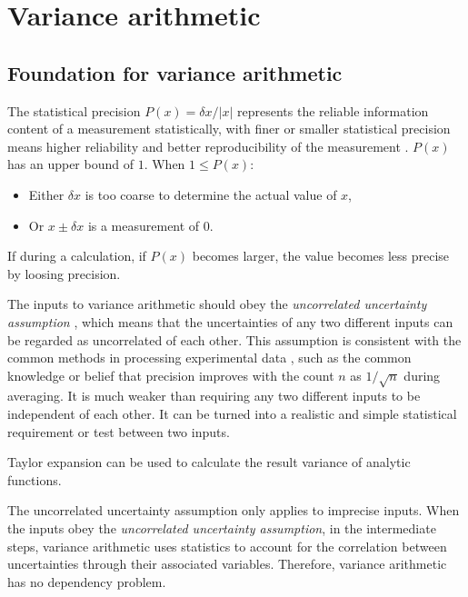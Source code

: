 \documentclass[twoside]{article}
\numberwithin{equation}{section}
\begin{document}
\clearpage
\section{Variance arithmetic}
\label{sec: variance arithmetic}


\subsection{Foundation for variance arithmetic}

The statistical precision $P(x) = \delta x/|x|$ represents the reliable information content of a measurement statistically, with finer or smaller statistical precision means higher reliability and better reproducibility of the measurement \cite{Statistical_Methods}\cite{Precisions_Physical_Measurements}. 
$P(x)$ has an upper bound of $1$.
When $1 \leq P(x)$:
\begin{itemize}
\item Either $\delta x$ is too coarse to determine the actual value of $x$, 

\item Or $x \pm \delta x$ is a measurement of $0$.
\end{itemize}
If during a calculation, if $P(x)$ becomes larger, the value becomes less precise by loosing precision.

The inputs to variance arithmetic should obey the \emph{uncorrelated uncertainty assumption} \cite{Prev_Precision_Arithmetic}, which means that the uncertainties of any two different inputs can be regarded as uncorrelated of each other. 
This assumption is consistent with the common methods in processing experimental data \cite{Statistical_Methods}\cite{Precisions_Physical_Measurements}, such as the common knowledge or belief that precision improves with the count $n$ as $1 / \sqrt{n}$ during averaging.
It is much weaker than requiring any two different inputs to be independent of each other.
It can be turned into a realistic and simple statistical requirement or test between two inputs.

Taylor expansion can be used to calculate the result variance of analytic functions.

The uncorrelated uncertainty assumption only applies to imprecise inputs.
When the inputs obey the \emph{uncorrelated uncertainty assumption}, in the intermediate steps, variance arithmetic uses statistics to account for the correlation between uncertainties through their associated variables.
Therefore, variance arithmetic has no dependency problem.
\end{document}
